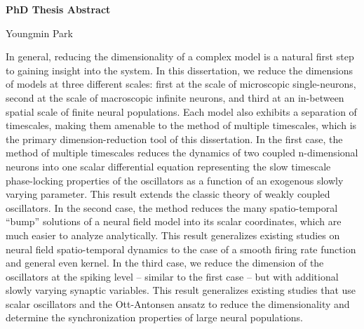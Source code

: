 \documentclass[a4paper,11pt]{article}
\begin{document}
\begin{center}
\Large \textbf{PhD Thesis Abstract}

\Large Youngmin Park
\end{center}

In general, reducing the dimensionality of a complex model is a natural first step to gaining insight into the system. In this dissertation, we reduce the dimensions of models at three different scales: first at the scale of microscopic single-neurons, second at the scale of macroscopic infinite neurons, and third at an in-between spatial scale of finite neural populations. Each model also exhibits a separation of timescales, making them amenable to the method of multiple timescales, which is the primary dimension-reduction tool of this dissertation. In the first case, the method of multiple timescales reduces the dynamics of two coupled n-dimensional neurons into one scalar differential equation representing the slow timescale phase-locking properties of the oscillators as a function of an exogenous slowly varying parameter. This result extends the classic theory of weakly coupled oscillators. In the second case, the method reduces the many spatio-temporal  ``bump'' solutions of a neural field model into its scalar coordinates, which are much easier to analyze analytically. This result generalizes existing studies on neural field spatio-temporal dynamics to the case of a smooth firing rate function and general even kernel. In the third case, we reduce the dimension of the oscillators at the spiking level -- similar to the first case --  but with additional slowly varying synaptic variables. This result generalizes existing studies that use scalar oscillators and the Ott-Antonsen ansatz to reduce the dimensionality and determine the synchronization properties of large neural populations.
\end{document}
